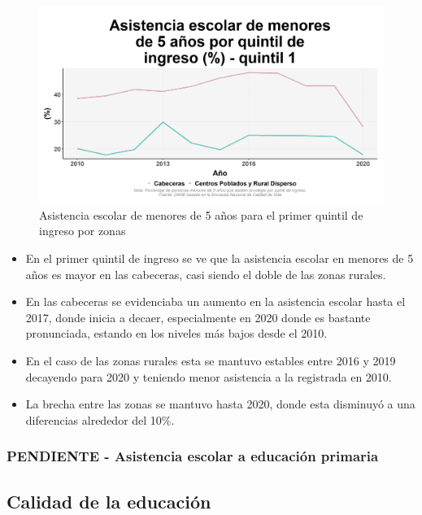     \begin{figure}[H]
        \caption{Asistencia escolar de menores de 5 años para el primer quintil de ingreso por zonas \label{map_result_2} }
        \begin{center}
        \includegraphics[width=\textwidth,keepaspectratio]{img/var_102_trend.png}
        \end{center}
    \end{figure}
            \begin{itemize}
                \item En el primer quintil de ingreso se ve que la asistencia escolar en menores de 5 años es mayor en las cabeceras, casi siendo el doble de las zonas rurales.
                \item En las cabeceras se evidenciaba un aumento en la asistencia escolar hasta el 2017, donde inicia a decaer, especialmente en 2020 donde es bastante pronunciada, estando en los niveles más bajos desde el 2010.
                \item En el caso de las zonas rurales esta se mantuvo estables entre 2016 y 2019 decayendo para 2020 y teniendo menor asistencia a la registrada en 2010.
                \item La brecha entre las zonas se mantuvo hasta 2020, donde esta disminuyó a una diferencias alrededor del 10\%.
                \end{itemize}

        \subsubsection{PENDIENTE - Asistencia escolar a educación primaria}
        
    \subsection{Calidad de la educación}
